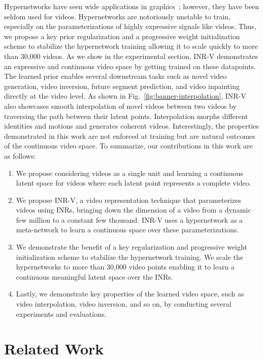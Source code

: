 \documentclass[10pt]{article} \usepackage[accepted]{tmlr}
\begin{document}
Hypernetworks have seen wide applications in graphics~\cite{siren, lfns, 3dhypernet1, 3dhypernet2}; however, they have been seldom used for videos. 
Hypernetworks are notoriously unstable \cite{} to train, especially on the parameterizations of highly expressive signals like videos. Thus, we propose a key prior regularization and a progressive weight initialization scheme to stabilize the hypernetwork training allowing it to scale quickly to more than $30$,$000$ videos. As we show in the experimental section, INR-V demonstrates an expressive and continuous video space by getting trained on these datapoints. 
The learned prior enables several downstream tasks such as novel video generation, video inversion, future segment prediction, and video inpainting directly at the video level. As shown in Fig.~\ref{fig:banner-interpolation}, INR-V also showcases smooth interpolation of novel videos between two videos by traversing the path between their latent points. Interpolation morphs different identities and motions and generates coherent videos. Interestingly, the properties demonstrated in this work are not enforced at training but are natural outcomes of the continuous video space. 
To summarize, our contributions in this work are as follows: 
\begin{enumerate}
    \item We propose considering videos as a single unit and learning a continuous latent space for videos where each latent point represents a complete video. 
    \item We propose INR-V, a video representation technique that parameterizes videos using INRs, bringing down the dimension of a video from a dynamic few million to a constant few thousand. INR-V uses a hypernetwork as a meta-network to learn a continuous space over these parameterizations.
    \item We demonstrate the benefit of a key regularization and progressive weight initialization scheme to stabilize the hypernetwork training. We scale the hypernetworks to more than $30$,$000$ video points enabling it to learn a continuous meaningful latent space over the INRs. 
    \item Lastly, we demonstrate key properties of the learned video space, such as video interpolation, video inversion, and so on, by conducting several experiments and evaluations. 
\end{enumerate}

\section{Related Work}
\label{related_work}
\end{document}
